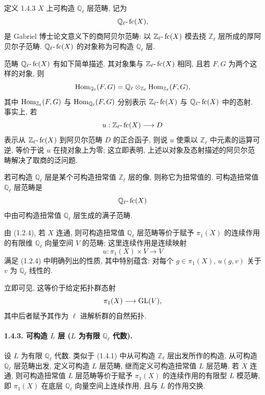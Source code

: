 \begin{statement}{定义 1.4.3}
\(X\) 上可构造 \(\mathbb Q_\ell\) 层范畴, 记为
\[
\mathbb Q_\ell\text{-}\operatorname{fc}(X),
\]
是 Gabriel 博士论文意义下的商阿贝尔范畴: 以 \(\mathbb Z_\ell\text{-}\operatorname{fc}(X)\) 模去挠 \(\mathbb Z_\ell\) 层所成的厚阿贝尔子范畴. \(\mathbb Q_\ell\text{-}\operatorname{fc}(X)\) 的对象称为可构造 \(\mathbb Q_\ell\) 层.
\end{statement}

范畴 \(\mathbb Q_\ell\text{-}\operatorname{fc}(X)\) 有如下简单描述. 其对象集与 \(\mathbb Z_\ell\text{-}\operatorname{fc}(X)\) 相同, 且若 \(F,G\) 为两个这样的对象, 则
\[
\operatorname{Hom}_{\mathbb Q_\ell}(F,G)
=\mathbb Q_\ell\otimes_{\mathbb Z_\ell}\operatorname{Hom}_{\mathbb Z_\ell}(F,G),
\]
其中 \(\operatorname{Hom}_{\mathbb Z_\ell}(F,G)\) 与 \(\operatorname{Hom}_{\mathbb Q_\ell}(F,G)\) 分别表示 \(\mathbb Z_\ell\text{-}\operatorname{fc}(X)\) 与 \(\mathbb Q_\ell\text{-}\operatorname{fc}(X)\) 中的态射. 事实上, 若
\[
u:\mathbb Z_\ell\text{-}\operatorname{fc}(X)\longrightarrow D
\]
表示从 \(\mathbb Z_\ell\text{-}\operatorname{fc}(X)\) 到阿贝尔范畴 \(D\) 的正合函子, 则说 \(u\) 使乘以 \(\mathbb Z_\ell\) 中元素的运算可逆, 等价于说 \(u\) 在挠对象上为零; 这立即表明, 上述以对象及态射描述的阿贝尔范畴解决了取商的泛问题.

若可构造 \(\mathbb Q_\ell\) 层是某个可构造扭常值 \(\mathbb Z_\ell\) 层的像, 则称它为扭常值的. 可构造扭常值 \(\mathbb Q_\ell\) 层范畴是
\[
\mathbb Q_\ell\text{-}\operatorname{fc}(X)
\]
中由可构造扭常值 \(\mathbb Q_\ell\) 层生成的满子范畴.

由 (1.2.4), 若 \(X\) 连通, 则可构造扭常值 \(\mathbb Q_\ell\) 层范畴等价于赋予 \(\pi_1(X)\) 的连续作用的有限维 \(\mathbb Q_\ell\) 向量空间 \(V\) 的范畴; 这里连续作用是连续映射
\[
u:\pi_1(X)\times V\longrightarrow V
\]
满足 (1.2.4) 中明确列出的性质, 其中特别蕴含: 对每个 \(g\in\pi_1(X)\), \(u(g,v)\) 关于 \(v\) 为 \(\mathbb Q_\ell\) 线性的.

立即可见, 这等价于给定拓扑群态射
\[
\pi_1(X)\longrightarrow \operatorname{GL}(V),
\]
其中后者赋予其作为 \(\ell\) 进解析群的自然拓扑.

\paragraph{1.4.3. 可构造 \(L\) 层 (\(L\) 为有限 \(\mathbb Q_\ell\) 代数).}
设 \(L\) 为有限 \(\mathbb Q_\ell\) 代数. 类似于 (1.4.1) 中从可构造 \(\mathbb Z_\ell\) 层出发所作的构造, 从可构造 \(\mathbb Q_\ell\) 层范畴出发, 定义可构造 \(L\) 层范畴, 继而定义可构造扭常值 \(L\) 层范畴. 若 \(X\) 连通, 则可构造扭常值 \(L\) 层范畴等价于赋予 \(\pi_1(X)\) 的连续作用的有限型 \(L\) 模范畴, 即 \(\pi_1(X)\) 在底层 \(\mathbb Q_\ell\) 向量空间上连续作用, 且与 \(L\) 的作用交换.

